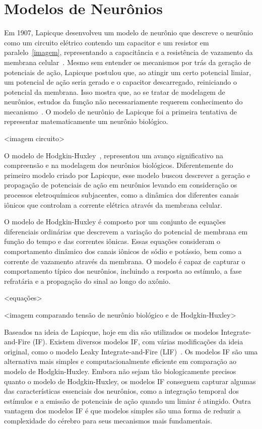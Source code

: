 \section{Modelos de Neurônios}

Em 1907, Lapicque desenvolveu um modelo de neurônio que descreve o neurônio como um circuito elétrico contendo um capacitor e um
resistor em paralelo~\ref{imagem}, representando a capacitância e a resistência de vazamento da membrana
celular~\cite{lapicqueRecherches1907}. Mesmo sem entender os mecanismos por trás da geração de potenciais de ação, Lapicque
postulou que, ao atingir um certo potencial limiar, um potencial de ação seria gerado e o capacitor descarregado, reiniciando o
potencial da membrana. Isso mostra que, ao se tratar de modelagem de neurônios, estudos da função não necessariamente requerem
conhecimento do mecanismo~\cite{abbottLapicque1999}. O modelo de neurônio de Lapicque foi a primeira tentativa de representar
matematicamente um neurônio biológico.

<imagem circuito>

O modelo de Hodgkin-Huxley~\cite{hodgkinQuantitative1952}, representou um avanço significativo na compreensão e na modelagem dos
neurônios biológicos. Diferentemente do primeiro modelo criado por Lapicque, esse modelo buscou descrever a geração e propagação
de potenciais de ação em neurônios levando em consideração os processos eletroquímicos subjacentes, como a dinâmica dos diferentes
canais iônicos que controlam a corrente elétrica através da membrana celular.

O modelo de Hodgkin-Huxley é composto por um conjunto de equações diferenciais ordinárias que descrevem a variação do potencial de
membrana em função do tempo e das correntes iônicas. Essas equações consideram o comportamento dinâmico dos canais iônicos de
sódio e potássio, bem como a corrente de vazamento através da membrana. O modelo é capaz de capturar o comportamento típico dos
neurônios, incluindo a resposta ao estímulo, a fase refratária e a propagação do sinal ao longo do axônio.

<equações>

<imagem comparando tensão de neurônio biológico e de Hodgkin-Huxley>

Baseados na ideia de Lapicque, hoje em dia são utilizados os modelos Integrate-and-Fire (IF). Existem diversos modelos IF, com
várias modificações da ideia original, como o modelo Leaky Integrate-and-Fire (LIF)~\cite{burkitt2006review}. Os modelos IF são
uma alternativa mais simples e computacionalmente eficiente em comparação ao modelo de Hodgkin-Huxley. Embora não sejam tão
biologicamente precisos quanto o modelo de Hodgkin-Huxley, os modelos IF conseguem capturar algumas das características essenciais
dos neurônios, como a integração temporal dos estímulos e a emissão de potenciais de ação quando um limiar é atingido. Outra
vantagem dos modelos IF é que modelos simples são uma forma de reduzir a complexidade do cérebro para seus mecanismos mais
fundamentais.

